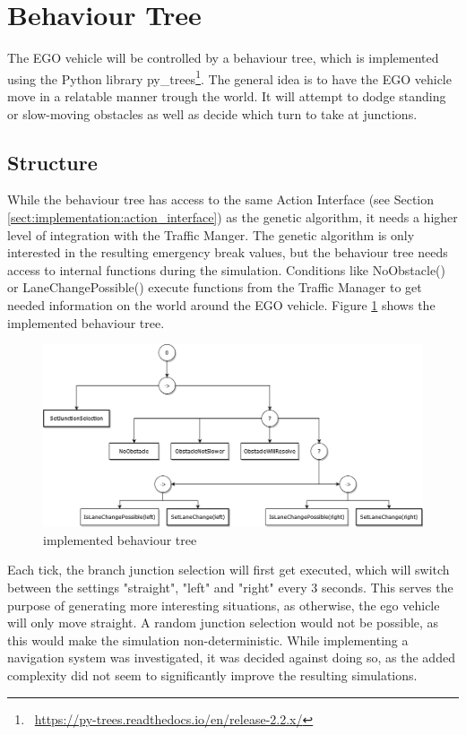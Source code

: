 \section{Behaviour Tree}
The EGO vehicle will be controlled by a behaviour tree, which is implemented using the Python library py\_trees\footnote{~\href{https://py-trees.readthedocs.io/en/release-2.2.x/}{https://py-trees.readthedocs.io/en/release-2.2.x/}}. The general idea is to have the EGO vehicle move in a relatable manner trough the world. It will attempt to dodge standing or slow-moving obstacles as well as decide which turn to take at junctions.

\subsection{Structure}
While the behaviour tree has access to the same Action Interface (see Section \ref{sect:implementation:action_interface}) as the genetic algorithm, it needs a higher level of integration with the Traffic Manger. The genetic algorithm is only interested in the resulting emergency break values, but the behaviour tree needs access to internal functions during the simulation. Conditions like NoObstacle() or LaneChangePossible() execute functions from the Traffic Manager to get needed information on the world around the EGO vehicle. Figure \ref{fig:implementation:bt} shows the implemented behaviour tree.

\begin{figure}[ht] 
	\includegraphics[width=1\linewidth]{figures/behaviorTree}
	\caption{implemented behaviour tree}
	\label{fig:implementation:bt}
\end{figure}

Each tick, the branch junction selection will first get executed, which will switch between the settings "straight", "left" and "right" every 3 seconds. This serves the purpose of generating more interesting situations, as otherwise, the ego vehicle will only move straight. A random junction selection would not be possible, as this would make the simulation non-deterministic. While implementing a navigation system was investigated, it was decided against doing so, as the added complexity did not seem to significantly improve the resulting simulations.

